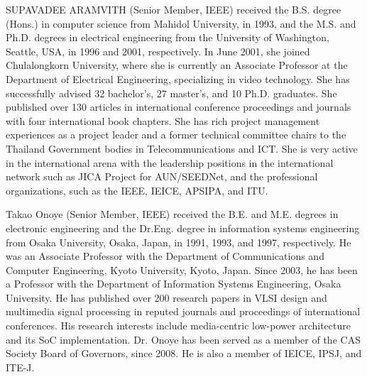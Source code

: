 \documentclass{ieeeaccess}
\begin{document}
\begin{IEEEbiography}{SUPAVADEE ARAMVITH} (Senior Member, IEEE) received the B.S. degree (Hons.) in computer science from Mahidol University, in 1993, and the M.S. and Ph.D. degrees in electrical engineering from the University of Washington, Seattle, USA, in 1996 and 2001, respectively. In June 2001, she joined Chulalongkorn University, where she is currently an Associate Professor at the Department of Electrical Engineering, specializing in video technology. She has successfully advised 32 bachelor’s, 27 master’s, and 10 Ph.D. graduates. She published over 130 articles in international conference proceedings and journals with four international book chapters. She has rich project management experiences as a project leader and a former technical committee chairs to the Thailand Government bodies in Telecommunications and ICT. She is very active in the international arena with the leadership positions in the international network such as JICA Project for AUN/SEEDNet, and the professional organizations, such as the IEEE, IEICE, APSIPA, and ITU.
\end{IEEEbiography}

\begin{IEEEbiography}{Takao Onoye} (Senior Member, IEEE) received the B.E. and M.E. degrees in electronic engineering and the Dr.Eng. degree in information systems engineering from Osaka University, Osaka, Japan, in 1991, 1993, and 1997, respectively. He was an Associate Professor with the Department of Communications and Computer Engineering, Kyoto University, Kyoto, Japan. Since 2003, he has been a Professor with the Department of Information Systems Engineering, Osaka University. He has published over 200 research papers in VLSI design and multimedia signal processing in reputed journals and proceedings of international conferences. His research interests include media-centric low-power architecture and its SoC implementation. Dr. Onoye has been served as a member of the CAS Society Board of Governors, since 2008. He is also a member of IEICE, IPSJ, and ITE-J.


\end{IEEEbiography}



\EOD
\end{document}
